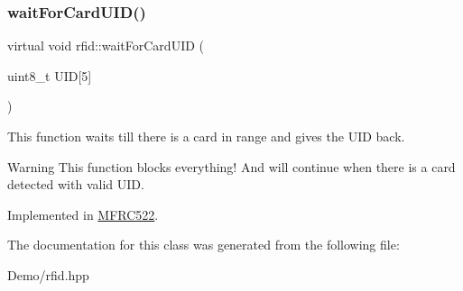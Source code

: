 \mbox{\label{classrfid_a1b324cb1e7b4c377eca4b3495d4189fd}} 
\subsubsection{\texorpdfstring{wait\+For\+Card\+U\+I\+D()}{waitForCardUID()}}
{\footnotesize\ttfamily virtual void rfid\+::wait\+For\+Card\+U\+ID (\begin{DoxyParamCaption}\item[{uint8\+\_\+t}]{U\+ID\mbox{[}5\mbox{]} }\end{DoxyParamCaption})\hspace{0.3cm}{\ttfamily [pure virtual]}}



This function waits till there is a card in range and gives the U\+ID back. 

\begin{DoxyWarning}{Warning}
This function blocks everything! And will continue when there is a card detected with valid U\+ID. 
\end{DoxyWarning}


Implemented in \mbox{\hyperlink{class_m_f_r_c522_aeb05c83c2d139eb2c57f400399982691}{M\+F\+R\+C522}}.



The documentation for this class was generated from the following file\+:\begin{DoxyCompactItemize}
\item 
Demo/rfid.\+hpp\end{DoxyCompactItemize}
